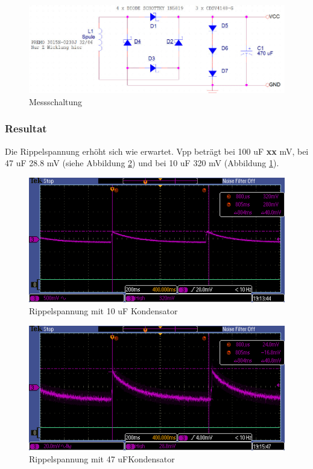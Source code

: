 \begin{figure}[h]
    \includegraphics[width=15cm]{3Vorgehen/imag/messschaltungHarvesterschaltung.jpg}
    \caption{Messschaltung}
\end{figure}

\subsubsection*{Resultat}

Die Rippelspannung erhöht sich wie erwartet. Vpp beträgt bei 100 uF \textbf{xx} mV, bei 47 uF 28.8 mV (siehe Abbildung \ref{kond47uF}) und bei 10 uF 320 mV (Abbildung \ref{kond10uF}).
 
\begin{figure}
    \includegraphics[width=15cm]{3Vorgehen/imag/10uF.PNG}
    \caption{Rippelspannung mit 10 uF Kondensator}\label{kond10uF} 
\end{figure}

\begin{figure}
    \includegraphics[width=15cm]{3Vorgehen/imag/47uF.PNG}
    \caption{Rippelspannung mit 47 uFKondensator}\label{kond47uF} 
\end{figure}

